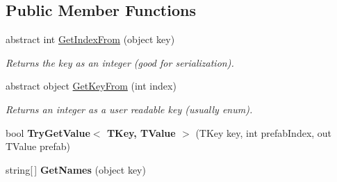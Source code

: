 \subsection*{Public Member Functions}
\begin{DoxyCompactItemize}
\item 
abstract int \hyperlink{class_skyrates_1_1_util_1_1_prefab_list_a40248f77efe56facd9bf1f534e0ed31e}{Get\-Index\-From} (object key)
\begin{DoxyCompactList}\small\item\em Returns the key as an integer (good for serialization). \end{DoxyCompactList}\item 
abstract object \hyperlink{class_skyrates_1_1_util_1_1_prefab_list_a5fc66fb12f8cb7148a783229e742ba72}{Get\-Key\-From} (int index)
\begin{DoxyCompactList}\small\item\em Returns an integer as a user readable key (usually enum). \end{DoxyCompactList}\item 
\hypertarget{class_skyrates_1_1_util_1_1_prefab_list_a257e47900416e06a7b6d0cc81de67d53}{bool {\bfseries Try\-Get\-Value$<$ T\-Key, T\-Value $>$} (T\-Key key, int prefab\-Index, out T\-Value prefab)}\label{class_skyrates_1_1_util_1_1_prefab_list_a257e47900416e06a7b6d0cc81de67d53}

\item 
\hypertarget{class_skyrates_1_1_util_1_1_prefab_list_acb6c22e0571f7768b0570de10e56fc9e}{string\mbox{[}$\,$\mbox{]} {\bfseries Get\-Names} (object key)}\label{class_skyrates_1_1_util_1_1_prefab_list_acb6c22e0571f7768b0570de10e56fc9e}

\end{DoxyCompactItemize}
